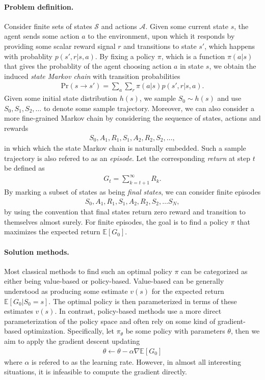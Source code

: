 \documentclass[a4paper]{report}
\theoremstyle{definition}
\theoremstyle{plain}
\begin{document}
\paragraph{Problem definition.}
Consider finite sets of states $\mathcal{S}$ and actions $\mathcal{A}$.
%
Given some current state $s$, the agent sends some action $a$ to the
environment, upon which it responds by providing some scalar reward signal $r$
and transitions to state $s'$, which happens with probablity $p(s', r | s, a)$.
%
By fixing a policy $\pi$, which is a function $\pi(a|s)$ that gives the
probablity of the agent choosing action $a$ in state $s$, we obtain the induced
\emph{state Markov chain} with transition probabilities
%
\begin{align*}
  \mathrm{Pr}(s \rightarrow s') = \sum_{a} \sum_{r} \pi(a|s) p(s', r | s, a) .
\end{align*}
Given some initial state distribution $h(s)$, we sample $S_{0} \sim h(s)$ and
use $S_{0}, S_{1}, S_{2}, \dots$ to denote some sample trajectory.
%
Moreover, we can also consider a more fine-grained Markov chain by considering
the sequence of states, actions and rewards
\begin{align*}
  S_{0}, A_{1}, R_{1}, S_{1}, A_{2}, R_{2}, S_{2}, \dots ,
\end{align*}
in which which the state Markov chain is naturally embedded. Such a sample
trajectory is also refered to as an \emph{episode}.
%
Let the corresponding \emph{return} at step $t$ be
defined as
\begin{align*}
  G_{t} = \sum_{k=t+1}^{\infty} R_{k} .
\end{align*}
By marking a subset of states as being \emph{final states}, we can consider finite episodes
\begin{align*}
  S_{0}, A_{1}, R_{1}, S_{1}, A_{2}, R_{2}, S_{2}, \dots S_{N},
\end{align*}
by using the convention that final states return zero reward and transition to
themselves almost surely.
%
For finite episodes, the goal is to find a policy $\pi$ that maximizes the
expected return $\mathbb{E}[G_{0}]$.

\paragraph{Solution methods.}
Most classical methods to find such an optimal policy $\pi$ can be categorized
as either being value-based or policy-based.
%
Value-based can be generally understood as producing some estimate $v(s)$ for
the expected return $\mathbb{E}[G_{0} | S_{0} = s]$. The optimal policy is then
parameterized in terms of these estimates $v(s)$.
%
In contrast, policy-based methods use a more direct parameterization of the
policy space and often rely on some kind of gradient-based optimization.
Specifically, let $\pi_{\theta}$ be some policy with parameters $\theta$, then we aim to
apply the gradient descent updating
\begin{align*}
  \theta \leftarrow \theta - \alpha \nabla \mathbb{E} [ G_{0} ]
\end{align*}
where $\alpha$ is refered to as the learning rate.
%
However, in almost all interesting situations, it is infeasible to compute the
gradient directly.
\end{document}
